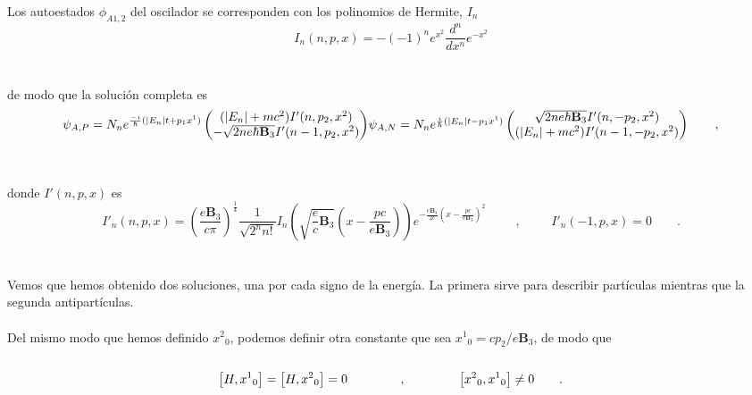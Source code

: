 \documentclass[11pt,letterpaper]{article}     %
\begin{document}
Los autoestados $\phi_{A1,2}$ del oscilador se corresponden con los polinomios de Hermite, $I_n$
\begin{equation}\label{eq:147}
I_n(n,p,x)=-(-1)^n e^{x^2} \frac{d^n}{dx^n}e^{-x^2}
\end{equation} \\ \\
de modo que la solución completa es
\begin{equation}\label{eq:148}
\psi_{A,P}=N_n e^{\frac{-i}{\hbar}(|E_n|t + p_1 x^1)} \begin{pmatrix}
(|E_n|+mc^2)I'(n,p_2,x^2) \\ -\sqrt{2ne \hbar \textbf{B}_3} I'(n-1,p_2,x^2)
\end{pmatrix} $$\\$$
\psi_{A,N}=N_n e^{\frac{i}{\hbar}(|E_n|t - p_1 x^1)} \begin{pmatrix}
\sqrt{2ne \hbar \textbf{B}_3} I'(n,-p_2,x^2) \\ (|E_n| + mc^2)I'(n-1,-p_2,x^2)
\end{pmatrix} \qquad ,
\end{equation} \\ \\
donde $I'(n,p,x)$ es
\begin{equation}\label{eq:149}
I'_{n}(n,p,x)=\left( \frac{e \textbf{B}_3}{c\pi} \right)^{\frac{1}{4}} \frac{1}{\sqrt{2^n n!}} I_n \left(\sqrt{\frac{e}{c} \textbf{B}_3}\left(x- \frac{pc}{e \textbf{B}_3}\right)\right) e^{-\frac{e \textbf{B}_3}{2c}\left(x-\frac{pc}{e \textbf{B}_3}\right)^2} \hspace{1cm}, \hspace{1cm} I'_n(-1,p,x)=0 \qquad .
\end{equation} \\ \\
Vemos que hemos obtenido dos soluciones, una por cada signo de la energía. La primera sirve para describir partículas mientras que la segunda antipartículas.\\ \\
Del mismo modo que hemos definido ${x^2}_0$, podemos definir otra constante que sea ${x^1}_0=c p_2/e \textbf{B}_3$, de modo que \\ \\
\begin{equation}\label{eq:150}
\left[H,{x^1}_0 \right] = \left[H,{x^2}_0 \right] = 0 \hspace{1,5cm}, \hspace{1,5cm} \left[{x^2}_0,{x^1}_0 \right] \neq 0 \qquad.
\end{equation} \\ \\
\end{document}
